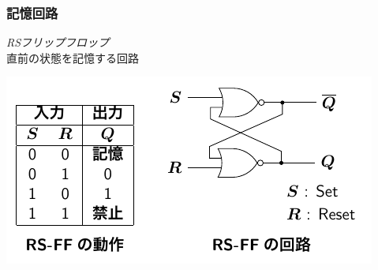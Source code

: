 \documentclass[handout]{beamer}        %
\begin{document}
\begin{frame}
  \frametitle{記憶回路}
  \emph{RSフリップフロップ} \\
  直前の状態を記憶する回路
  \vfill
  \centerline{\includegraphics[scale=1.3]{../Tikz/rsff.pdf}}
  \vfill
\end{frame}
\end{document}
